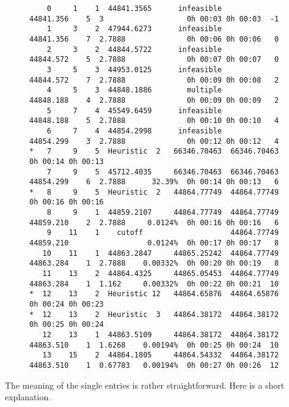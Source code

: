 \documentclass[11pt,draft]{article}
\newcommand{\+}{{\ti{+}}}
\newcommand{\1}{{\ti{1}}}
\begin{document}
\begin{figure}[ht]
{\begin{verbatim}
    0     1    1  44841.3565      infeasible                44841.356    5  3                   0h 00:03 0h 00:03  -1
    1     3    2  47944.6273      infeasible                44841.356    7  2.7888              0h 00:06 0h 00:06   0
    2     3    2  44844.5722      infeasible                44844.572    5  2.7888              0h 00:07 0h 00:07   0
    3     5    3  44953.0125      infeasible                44844.572    7  2.7888              0h 00:09 0h 00:08   2
    4     5    3  44848.1886        multiple                44848.188    4  2.7888              0h 00:09 0h 00:09   2
    5     7    4  45549.6459      infeasible                44848.188    5  2.7888              0h 00:10 0h 00:10   4
    6     7    4  44854.2998      infeasible                44854.299    3  2.7888              0h 00:12 0h 00:12   4
*   7     9    5  Heuristic  2   66346.70463  66346.70463                                       0h 00:14 0h 00:13
    7     9    5  45712.4035     66346.70463  66346.70463   44854.299    6  2.7888      32.39%  0h 00:14 0h 00:13   6
*   8     9    5  Heuristic  2   44864.77749  44864.77749                                       0h 00:16 0h 00:16
    8     9    1  44859.2107     44864.77749  44864.77749   44859.210    2  2.7888     0.0124%  0h 00:16 0h 00:16   6
    9    11    1    cutoff                    44864.77749   44859.210                  0.0124%  0h 00:17 0h 00:17   8
   10    11    1  44863.2847     44865.25242  44864.77749   44863.284    1  2.7888    0.00332%  0h 00:20 0h 00:19   8
   11    13    2  44864.4325     44865.05453  44864.77749   44863.284    1  1.162     0.00332%  0h 00:22 0h 00:21  10
*  12    13    2  Heuristic 12   44864.65876  44864.65876                                       0h 00:24 0h 00:23
*  12    13    2  Heuristic  3   44864.38172  44864.38172                                       0h 00:25 0h 00:24
   12    13    1  44863.5109     44864.38172  44864.38172   44863.510    1  1.6268    0.00194%  0h 00:25 0h 00:24  10
   13    15    2  44864.1805     44864.54332  44864.38172   44863.510    1  0.67783   0.00194%  0h 00:27 0h 00:26  12
\end{verbatim}
}
\end{figure}
%
The meaning of the single entries is rather straightforward. Here is a short
explanation. 
\end{document}
